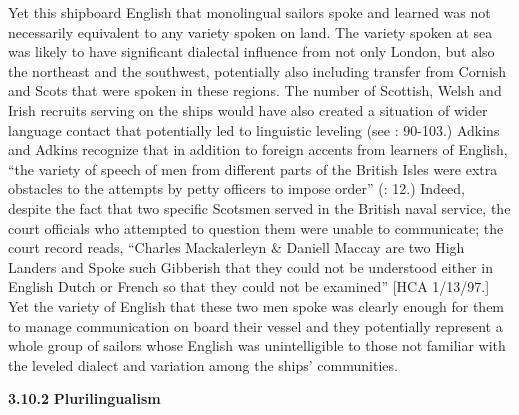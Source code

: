 Yet this shipboard English that monolingual sailors spoke and learned was not necessarily equivalent to any variety spoken on land. The variety spoken at sea was likely to have significant dialectal influence from not only London, but also the northeast and the southwest, potentially also including transfer from Cornish and Scots that were spoken in these regions. The number of Scottish, Welsh and Irish recruits serving on the ships would have also created a situation of wider language contact that potentially led to linguistic leveling (see \citealt{Trudgill1986}: 90-103.) Adkins and Adkins recognize that in addition to foreign accents from learners of English, “the variety of speech of men from different parts of the British Isles were extra obstacles to the attempts by petty officers to impose order” (\citealt{AdkinsAdkins2008}: 12.) Indeed, despite the fact that two specific Scotsmen served in the British naval service, the court officials who attempted to question them were unable to communicate; the court record reads, “Charles Mackalerleyn \& Daniell Maccay are two High Landers and Spoke such Gibberish that they could not be understood either in English Dutch or French so that they could not be examined” [HCA 1/13/97.] Yet the variety of English that these two men spoke was clearly enough for them to manage communication on board their vessel and they potentially represent a whole group of sailors whose English was unintelligible to those not familiar with the leveled dialect and variation among the ships’ communities. 

  \textbf{3.10.2} \textbf{Plurilingualism}

